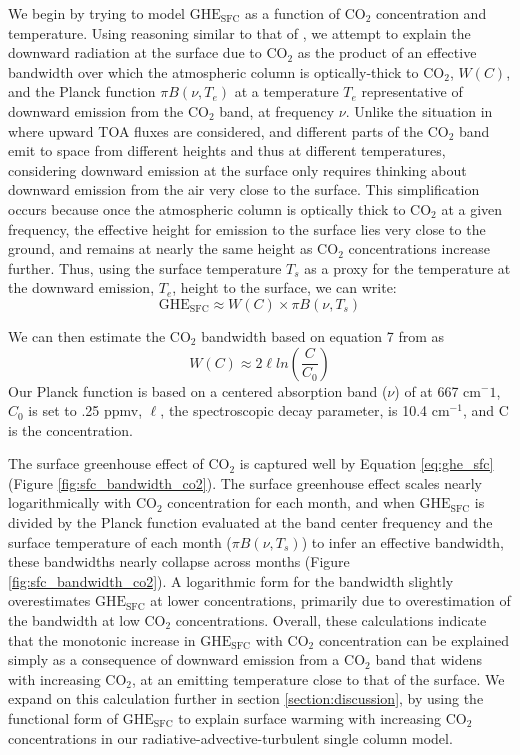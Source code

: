 \documentclass[draft]{agujournal2019}
\begin{document}
We begin by trying to model ${\text{GHE}_\text{{SFC}}}$ as a function of CO$_2$ concentration and temperature. Using reasoning similar to that of , we attempt to explain the downward radiation at the surface due to CO$_2$ as the product of an effective bandwidth over which the atmospheric column is optically-thick to CO$_2$, $W(C)$, and the Planck function $\pi B(\nu,T_e)$ at a temperature $T_e$ representative of downward emission from the CO$_2$ band, at frequency $\nu$. Unlike the situation in  where upward TOA fluxes are considered, and different parts of the CO$_2$ band emit to space from different heights and thus at different temperatures, considering downward emission at the surface only requires thinking about downward emission from the air very close to the surface. This simplification occurs because once the atmospheric column is optically thick to CO$_2$ at a given frequency, the effective height for emission to the surface lies very close to the ground, and remains at nearly the same height as CO$_2$ concentrations increase further. Thus, using the surface temperature $T_s$ as a proxy for the temperature at the downward emission, $T_e$, height to the surface, we can write:
\begin{equation}
    {\text{GHE}_\text{{SFC}}} \approx W(C)\times \pi B(\nu,T_s) \label{eq:ghe_sfc}
\end{equation}

We can then estimate the CO$_2$ bandwidth based on equation 7 from  as
\begin{equation}\label{eq:bandwidth}
    W(C) \approx 2\ell ln(\frac{C}{C_0})
\end{equation}
Our Planck function is based on a centered absorption band ($\nu$) of  at 667 cm$^-1$, $C_0$ is set to .25 ppmv, $\ell$, the spectroscopic decay parameter, is 10.4 cm$^{-1}$, and C is the  concentration. 

The surface greenhouse effect of CO$_2$ is captured well by Equation \ref{eq:ghe_sfc} (Figure \ref{fig:sfc_bandwidth_co2}). The surface greenhouse effect scales nearly logarithmically with CO$_2$ concentration for each month, and when ${\text{GHE}_\text{{SFC}}}$ is divided by the Planck function evaluated at the band center frequency and the surface temperature of each month ($\pi B(\nu,T_s)$) to infer an effective bandwidth, these bandwidths nearly collapse across months (Figure \ref{fig:sfc_bandwidth_co2}). A logarithmic form for the bandwidth slightly overestimates ${\text{GHE}_\text{{SFC}}}$ at lower  concentrations, primarily due to overestimation of the bandwidth at low CO$_2$ concentrations. Overall, these calculations indicate that the monotonic increase in ${\text{GHE}_\text{{SFC}}}$ with CO$_2$ concentration can be explained simply as a consequence of downward emission from a CO$_2$ band that widens with increasing CO$_2$, at an emitting temperature close to that of the surface. We expand on this calculation further in section \ref{section:discussion}, by using the functional form of ${\text{GHE}_\text{{SFC}}}$ to explain surface warming with increasing CO$_2$ concentrations in our radiative-advective-turbulent single column model.
\end{document}
